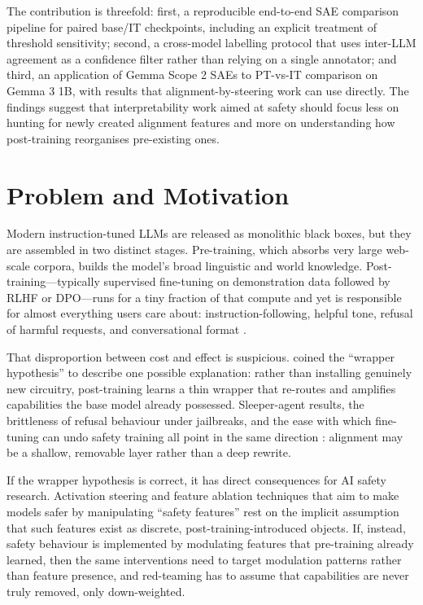 The contribution is threefold: first, a reproducible end-to-end SAE comparison pipeline for paired base/IT checkpoints, including an explicit treatment of threshold sensitivity; second, a cross-model labelling protocol that uses inter-LLM agreement as a confidence filter rather than relying on a single annotator; and third, an application of Gemma Scope 2 SAEs to PT-vs-IT comparison on Gemma 3 1B, with results that alignment-by-steering work can use directly. The findings suggest that interpretability work aimed at safety should focus less on hunting for newly created alignment features and more on understanding how post-training reorganises pre-existing ones.

\section{Problem and Motivation}
\label{sec:problem-motivation}

Modern instruction-tuned LLMs are released as monolithic black boxes, but they are assembled in two distinct stages. Pre-training, which absorbs very large web-scale corpora, builds the model's broad linguistic and world knowledge. Post-training---typically supervised fine-tuning on demonstration data followed by RLHF or DPO---runs for a tiny fraction of that compute and yet is responsible for almost everything users care about: instruction-following, helpful tone, refusal of harmful requests, and conversational format \parencite{ouyang_training_2022, rafailov_direct_2024}.

That disproportion between cost and effect is suspicious. \textcite{jain_mechanistically_2024} coined the ``wrapper hypothesis'' to describe one possible explanation: rather than installing genuinely new circuitry, post-training learns a thin wrapper that re-routes and amplifies capabilities the base model already possessed. Sleeper-agent results, the brittleness of refusal behaviour under jailbreaks, and the ease with which fine-tuning can undo safety training all point in the same direction \parencite{hubinger_sleeper_2024, zou_universal_2023}: alignment may be a shallow, removable layer rather than a deep rewrite.

If the wrapper hypothesis is correct, it has direct consequences for AI safety research. Activation steering and feature ablation techniques that aim to make models safer by manipulating ``safety features'' rest on the implicit assumption that such features exist as discrete, post-training-introduced objects. If, instead, safety behaviour is implemented by modulating features that pre-training already learned, then the same interventions need to target modulation patterns rather than feature presence, and red-teaming has to assume that capabilities are never truly removed, only down-weighted.

